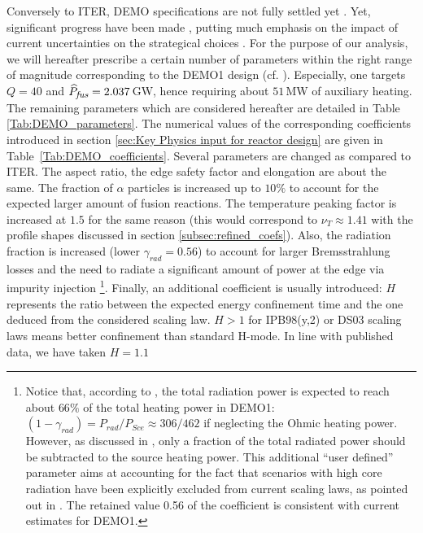\documentclass[12pt]{iopart}
\newcommand{\hatPfus}{{\widehat{P}_{\textrm{\it\footnotesize fus}}}}
\begin{document}
Conversely to ITER, DEMO specifications are not fully settled yet \cite{Zohm2010}. Yet, significant progress have been made \cite{Federici2017}, putting much emphasis on the impact of current uncertainties on the strategical choices \cite{Coleman2016, Coleman2019}. For the purpose of our analysis, we will hereafter prescribe a certain number of parameters within the right range of magnitude corresponding to the DEMO1 design (cf. \cite[Table 1]{Wenninger2017}). Especially, one targets $Q=40$ and $\hatPfus = 2.037\,$GW, hence requiring about $51\,$MW of auxiliary heating. The remaining parameters which are considered hereafter are detailed in Table \ref{Tab:DEMO_parameters}. The numerical values of the corresponding coefficients introduced in section \ref{sec:Key Physics input for reactor design} are given in Table~\ref{Tab:DEMO_coefficients}. Several parameters are changed as compared to ITER. The aspect ratio, the edge safety factor and elongation are about the same. The fraction of $\alpha$ particles is increased up to $10\%$ to account for the expected larger amount of fusion reactions. The temperature peaking factor is increased at $1.5$ for the same reason (this would correspond to $\nu_T\approx 1.41$ with the profile shapes discussed in section \ref{subsec:refined_coefs}). Also, the radiation fraction is increased (lower $\gamma_{rad} =0.56$) to account for larger Bremsstrahlung losses and the need to radiate a significant amount of power at the edge via impurity injection 
\footnote{ \label{footnote_gamma_rad} Notice that, according to \cite{Wenninger2017}, the total radiation power is expected to reach about $66\%$ of the total heating power in DEMO1: $(1-\gamma_{rad}) = P_{rad}/P_{Sce} \approx 306/462$ if neglecting the Ohmic heating power. However, as discussed in \cite{Lux2015}, only a fraction of the total radiated power should be subtracted to the source heating power. This additional ``user defined'' parameter aims at accounting for the fact that scenarios with high core radiation have been explicitly excluded from current scaling laws, as pointed out in \cite{Zohm2013}. The retained value 0.56 of the coefficient is consistent with current estimates for DEMO1.}.
Finally, an additional coefficient is usually introduced: $H$ represents the ratio between the expected energy confinement time and the one deduced from the considered scaling law. $H>1$ for IPB98(y,2) or DS03 scaling laws means better confinement than standard H-mode. In line with published data, we have taken $H=1.1$ 
\end{document}
